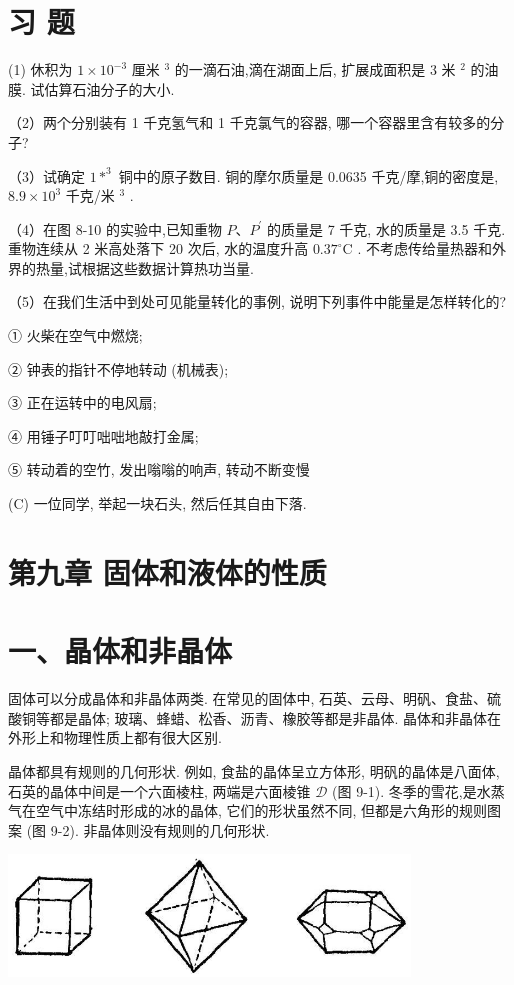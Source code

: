 \documentclass[10pt]{article}
\begin{document}
\section*{习 题}

(1) 休积为 \(1 \times {10}^{-3}\) 厘米 \({}^{3}\) 的一滴石油,滴在湖面上后, 扩展成面积是 3 米 \({}^{2}\) 的油膜. 试估算石油分子的大小.

（2）两个分别装有 1 千克氢气和 1 千克氯气的容器, 哪一个容器里含有较多的分子?

（3）试确定 \(1{ * }^{3}\) 铜中的原子数目. 铜的摩尔质量是 0.0635 千克/摩,铜的密度是, \({8.9} \times {10}^{3}\) 千克/米 \({}^{3}\) .

（4）在图 8-10 的实验中,已知重物 \(P\text{、}{P}^{\prime }\) 的质量是 7 千克, 水的质量是 3.5 千克. 重物连续从 2 米高处落下 20 次后, 水的温度升高 \({0.37}^{ \circ }\mathrm{C}\) . 不考虑传给量热器和外界的热量,试根据这些数据计算热功当量.

（5）在我们生活中到处可见能量转化的事例, 说明下列事件中能量是怎样转化的?

① 火柴在空气中燃烧;

② 钟表的指针不停地转动 (机械表);

③ 正在运转中的电风扇;

④ 用锤子叮叮咄咄地敲打金属;

⑤ 转动着的空竹, 发出嗡嗡的响声, 转动不断变慢

(C) 一位同学, 举起一块石头, 然后任其自由下落.

\section*{第九章 固体和液体的性质}

\section*{一、晶体和非晶体}

固体可以分成晶体和非晶体两类. 在常见的固体中, 石英、云母、明矾、食盐、硫酸铜等都是晶体; 玻璃、蜂蜡、松香、沥青、橡胶等都是非晶体. 晶体和非晶体在外形上和物理性质上都有很大区别.

晶体都具有规则的几何形状. 例如, 食盐的晶体呈立方体形, 明矾的晶体是八面体, 石英的晶体中间是一个六面棱柱, 两端是六面棱锥 \(\mathcal{D}\) (图 9-1). 冬季的雪花,是水蒸气在空气中冻结时形成的冰的晶体, 它们的形状虽然不同, 但都是六角形的规则图案 (图 9-2). 非晶体则没有规则的几何形状.

\begin{center}
\includegraphics[max width=0.8\textwidth]{images/01912d55-147c-70aa-b0e0-1782a122f948_260_110520.jpg}
\end{center}
\end{document}

